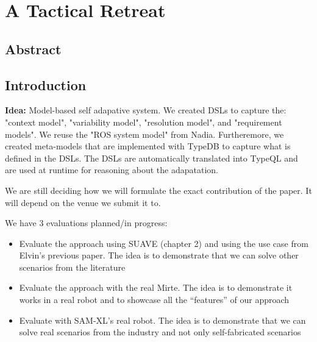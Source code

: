 \chapter{A Tactical Retreat}
\label{rosa_eval}

\begin{abstract}
Sample Abstract.
\end{abstract}


\newpage

\section{Abstract}

\section{Introduction}

\textbf{Idea:} Model-based self adapative system. We created DSLs to capture the: "context model", "variability model", "resolution model", and "requirement models". We reuse the "ROS system model" from Nadia. Furtheremore, we created meta-models that are implemented with TypeDB to capture what is defined in the DSLs. The DSLs are automatically translated into TypeQL and are used at runtime for reasoning about the adapatation.

We are still deciding how we will formulate the exact contribution of the paper. It will depend on the venue we submit it to.

We have 3 evaluations planned/in progress:

\begin{itemize}
    \item Evaluate the approach using SUAVE (chapter 2) and using the use case from Elvin's previous paper. The idea is to demonstrate that we can solve other scenarios from the literature
    \item Evaluate the approach with the real Mirte. The idea is to demonstrate it works in a real robot and to showcase all the ``features'' of our approach
    \item Evaluate with SAM-XL's real robot. The idea is to demonstrate that we can solve real scenarios from the industry and not only self-fabricated scenarios
\end{itemize}

